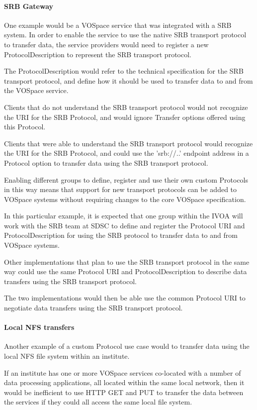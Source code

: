 \documentclass[11pt,a4paper]{ivoa}
\begin{document}
\paragraph{SRB Gateway}
One example would be a VOSpace service that was integrated with a SRB system. In order to enable the service to use the native SRB transport protocol to transfer data, the service providers would need to register a new ProtocolDescription to represent the SRB transport protocol.

The ProtocolDescription would refer to the technical specification for the SRB transport protocol, and define how it should be used to transfer data to and from the VOSpace service.

Clients that do not understand the SRB transport protocol would not recognize the URI for the SRB Protocol, and would ignore Transfer options offered using this Protocol.

Clients that were able to understand the SRB transport protocol would recognize the URI for the SRB Protocol, and could use the 'srb://..' endpoint address in a Protocol option to transfer data using the SRB transport protocol.

Enabling different groups to define, register and use their own custom Protocols in this way means that support for new transport protocols can be added to VOSpace systems without requiring changes to the core VOSpace specification.

In this particular example, it is expected that one group within the IVOA will work with the SRB team at SDSC to define and register the Protocol URI and ProtocolDescription for using the SRB protocol to transfer data to and from VOSpace systems.

Other implementations that plan to use the SRB transport protocol in the same way could use the same Protocol URI and ProtocolDescription to describe data transfers using the SRB transport protocol.

The two implementations would then be able use the common Protocol URI to negotiate data transfers using the SRB transport protocol.

\paragraph{Local NFS transfers}
Another example of a custom Protocol use case would to transfer data using the local NFS file system within an institute.

If an institute has one or more VOSpace services co-located with a number of data processing applications, all located within the same local network, then it would be inefficient to use HTTP GET and PUT to transfer the data between the services if they could all access the same local file system.
\end{document}
